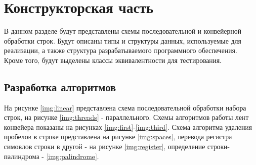 \chapter{Конструкторская часть}

В данном разделе будут представлены схемы последовательной и конвейерной обработки строк. Будут описаны типы и структуры данных, используемые для реализации, а также структура разрабатываемого программного обеспечения. Кроме того, будут выделены классы эквивалентности для тестирования.

\section{Разработка алгоритмов}

На рисунке \ref{img:linear} представлена схема последовательной обработки набора строк, на рисунке \ref{img:threads} - параллельного. Схемы алгоритмов работы лент конвейера показаны на рисунках \ref{img:first}-\ref{img:third}. Схема алгоритма удаления пробелов в строке представлена на рисунке \ref{img:spaces}, перевода регистра симовлов строки в другой - на рисунке \ref{img:register}, определение строки-палиндрома - \ref{img:palindrome}.


